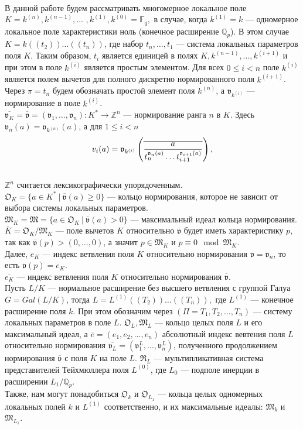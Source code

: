 \documentclass[a4paper]{article}
\newcommand{\Qp}{\mathbb{Q}_p}
\newcommand{\Fq}{\mathbb{F}_q}
\newcommand{\Z}{\mathbb{Z}}
\newcommand{\ML}{\mathfrak{M}_L}
\newcommand{\MLO}{\mathfrak{M}_{L_1}}
\newcommand{\MK}{\mathfrak{M}_K}
\newcommand{\Mk}{\mathfrak{M}_k}
\newcommand{\Ok}{\mathfrak{O}_k}
\newcommand{\OK}{\mathfrak{O}_K}
\newcommand{\OL}{\mathfrak{O}_L}
\newcommand{\OLO}{\mathfrak{O}_{L_1}}
\newcommand{\RL}{\mathfrak{R}_L}
\newcommand{\val}{\mathfrak{v}}
\newcommand{\olval}{\overline{\mathfrak{v}}}
\newcommand{\Leq}{\leqslant}
\newcommand{\Geq}{\geqslant}
\begin{document}
\paragraph{}
В данной работе будем рассматривать многомерное локальное поле $K=k^{(n)}, k^{(n-1)},\dots$ $,k^{(1)},k^{(0)}=\Fq,$ в случае, когда $k^{(1)} = k$ --- одномерное локальное поле характеристики ноль (конечное расширение $\Qp$). В этом случае $K = k((t_2))\dots((t_n))$, где набор $t_n,\dots,t_1$ --- система локальных параметров поля $K$. Таким образом, $t_i$ является единицей в полях $K,k^{(n-1)},\dots,k^{(i+1)}$ и при этом в поле $k^{(i)}$ является простым элементом. Для всех $0 \Leq i < n$ поле $k^{(i)}$ является полем вычетов для полного дискретно нормированного поля $k^{(i+1)}$. Через $\pi = t_n$ будем обозначать простой элемент поля $k^{(n)}$, а $\val_{k^{(i)}}$ --- нормирование в поле $k^{(i)}$.\\
$\overline{\val_K}=\olval=(\val_1,\dots,\val_n):K^*\rightarrow\Z^n$ --- нормирование ранга $n$ в $K$. Здесь $\val_n(a)=\val_{k^{(n)}}(a)$, а для $1\Leq i<n$
$$v_i(a) = \val_{k^{(i)}} \left( \overline {a \over { t_n^{\val_n(a)} \ldots t_{i+1}^{\val_{i+1}(a)} } } \right),$$\\
$\Z^n$ считается лексикографически упорядоченным.\\
$\OK=\{a\in K^*\ |\ \overline{\val}(a)\Geq0\}$ --- кольцо нормирования, которое не зависит от выбора системы локальных параметров.\\
$\MK=\mathfrak{M}=\{a\in\OK\ |\ \overline{\val}(a)>0\}$ --- максимальный идеал кольца нормирования.\\
$\overline{K} = \OK/\MK$ --- поле вычетов $K$ относительно $\olval$ будет иметь характеристику $p$, так как $\olval(p) > (0,\ldots,0)$, а значит $p\in \MK$ и $p \equiv 0 \mod \MK$.\\
Далее, $e_K$ --- индекс ветвления поля $K$ относительно нормирования $\val=\val_n$, то есть $\val(p)=e_K$.\\
$\overline{e_K}$ --- индекс ветвления поля $K$ относительно нормирования $\olval$.\\

Пусть $L/K$ --- нормальное расширение без высшего ветвления с группой Галуа $G=Gal(L/K)$, тогда $L = L^{(1)}((T_2))\dots((T_n)),$ где $L^{(1)}$ --- конечное расширение поля $k$. При этом обозначим через $(\Pi = T_1, T_2, \dots, T_n)$ --- систему локальных параметров в поле $L$.
$\OL,\ML$ --- кольцо целых поля $L$ и его максимальный идеал, а $\overline{e}=(e_1, e_2, \ldots, e_n)$ абсолютный индекс вевтения поля $L$ относительно нормирования $\overline{\val_L} = (\val_1^L, \ldots, \val_n^L)$, полученного продолжением нормирования $\olval$ с поля $K$ на поле $L$. $\RL$ --- мультипликативная система представителей Тейхмюллера поля $L^{(0)}$, где $L_0$ --- подполе инерции в расширении $L_1/\Qp$.\\
Также, нам могут понадобиться $\Ok$ и $\OLO$ --- кольца целых одномерных локальных полей $k$ и $L^{(1)}$ соответственно, и их максимальные идеалы: $\Mk$ и $\MLO$.
\end{document}
